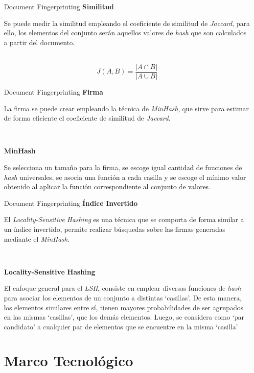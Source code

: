 \documentclass{beamer}
\begin{document}
\begin{frame}{Document Fingerprinting}
\textbf{Similitud}

Se puede medir la similitud empleando el coeficiente de similitud de \textit{Jaccard},
para ello, los elementos del conjunto serán aquellos valores de \textit{hash} que son calculados a partir del documento.

~
\begin{equation*}
J(A, B) = \frac{|A \cap B|}{|A \cup B|}
\end{equation*}
\end{frame}

\begin{frame}{Document Fingerprinting}
\textbf{Firma}

La firma se puede crear empleando la técnica de \textit{MinHash},
que sirve para estimar de forma eficiente el coeficiente de similitud de \textit{Jaccard}.

~

\textbf{MinHash}

Se selecciona un tamaño para la firma, 
se escoge igual cantidad de funciones de \textit{hash} universales,
se asocia una función a cada casilla y
se escoge el mínimo valor obtenido al aplicar la función correspondiente al conjunto de valores.
\end{frame}

\begin{frame}{Document Fingerprinting}
\textbf{Índice Invertido}

El \textit{Locality-Sensitive Hashing} es una técnica que se comporta de forma similar a un índice invertido,
permite realizar búsquedas sobre las firmas generadas mediante el \textit{MinHash}.

~

\textbf{Locality-Sensitive Hashing}

El enfoque general para el \textit{LSH},
consiste en emplear diversas funciones de \textit{hash} para asociar
los elementos de un conjunto a distintas ‘casillas’.
De esta manera, los elementos similares entre sí,
tienen mayores probabilidades de ser agrupados en las mismas ‘casillas’,
que los demás elementos.
Luego, se considera como ‘par candidato’
a cualquier par de elementos que se encuentre en la misma ‘casilla’
\end{frame}



\section{Marco Tecnológico}
\end{document}
